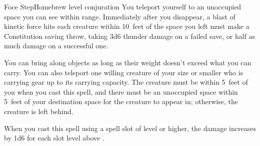 \begin{spell}{Foce Step}{Homebrew}{ level conjuration}
{
}
You teleport yourself to an unoccupied space you can
see within range. Immediately after you disappear, a
blast of kinetic force hits each creature within
10~feet of the space you left must make a Constitution saving
throw, taking 3d6 thunder damage on a failed save,
or half as much damage on a successful one.

You can bring along objects as long as their weight
doesn't exceed what you can carry. You can also teleport
one willing creature of your size or smaller who is
carrying gear up to its carrying capacity. The creature
must be within 5~feet of you when you cast this spell,
and there must be an unoccupied space within 5~feet of
your destination space for the creature to appear in; otherwise,
the creature is left behind.

 When you cast this spell using a
spell slot of  level or higher, the damage increases by
1d6 for each slot level above .
\end{spell}